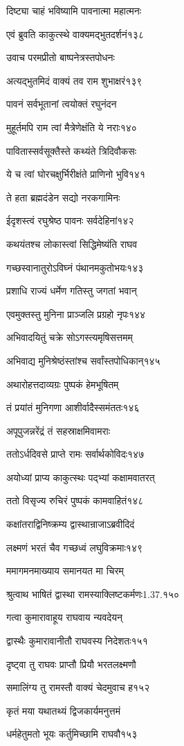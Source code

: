 दिष्ट्या चाहं भविष्यामि पावनात्मा महात्मनः

एवं ब्रुवति काकुत्स्थे वाक्यमद्भुतदर्शनं१३८

उवाच परमप्रीतो बाष्पनेत्रस्तपोधनः

अत्यद्भुतमिदं वाक्यं तव राम शुभाक्षरं१३९

पावनं सर्वभूतानां त्वयोक्तं रघुनंदन

मुहूर्तमपि राम त्वां मैत्रेणेक्षंति ये नराः१४०

पावितास्सर्वसूक्तैस्ते कथ्यंते त्रिदिवौकसः

ये च त्वां घोरचक्षुर्भिरीक्षंते प्राणिनो भुवि१४१

ते हता ब्रह्मदंडेन सद्यो नरकगामिनः

ईदृशस्त्वं रघुश्रेष्ठ पावनः सर्वदेहिनां१४२

कथयंतश्च लोकास्त्वां सिद्धिमेष्यंति राघव

गच्छस्वानातुरोऽविघ्नं पंथानमकुतोभयः१४३

प्रशाधि राज्यं धर्मेण गतिस्तु जगतां भवान्

एवमुक्तस्तु मुनिना प्राञ्जलि प्रग्रहो नृपः१४४

अभिवादयितुं चक्रे सोऽगस्त्यमृषिसत्तमम्

अभिवाद्य मुनिश्रेष्ठंस्तांश्च सर्वांस्तपोधिकान्१४५

अथारोहत्तदाव्यग्रः पुष्पकं हेमभूषितम्

तं प्रयांतं मुनिगणा आशीर्वादैस्समंततः१४६

अपूपुजन्नरेंद्रं तं सहस्राक्षमिवामराः

ततोऽर्धदिवसे प्राप्ते रामः सर्वार्थकोविदः१४७

अयोध्यां प्राप्य काकुत्स्थः पद्भ्यां कक्षामवातरत्

ततो विसृज्य रुचिरं पुष्पकं कामवाहितं१४८

कक्षांतराद्विनिष्क्रम्य द्वास्थान्राजाऽब्रवीदिदं

लक्ष्मणं भरतं चैव गच्छध्वं लघुविक्रमाः१४९

ममागमनमाख्याय समानयत मा चिरम्

श्रुत्वाथ भाषितं द्वास्था रामस्याक्लिष्टकर्मणः1.37.१५०

गत्वा कुमारावाहूय राघवाय न्यवदेयन्

द्वास्थैः कुमारावानीतौ राघवस्य निदेशतः१५१

दृष्ट्वा तु राघवः प्राप्तौ प्रियौ भरतलक्ष्मणौ

समालिंग्य तु रामस्तौ वाक्यं चेदमुवाच ह१५२

कृतं मया यथातथ्यं द्विजकार्यमनुत्तमं

धर्महेतुमतो भूयः कर्तुमिच्छामि राघवौ१५३

